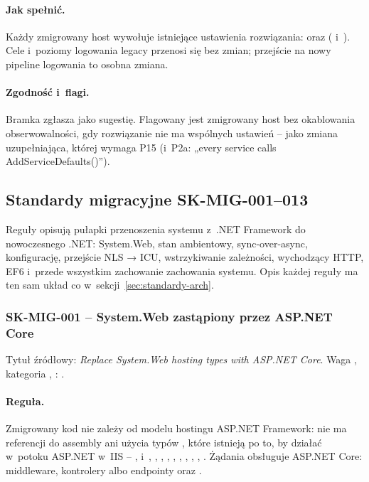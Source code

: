\paragraph{Jak spełnić.} Każdy zmigrowany host wywołuje istniejące ustawienia rozwiązania:
 oraz 
( i~). Cele i~poziomy logowania legacy przenosi się bez
zmian; przejście na nowy pipeline logowania to osobna zmiana.

\paragraph{Zgodność i~flagi.} Bramka zgłasza 
jako sugestię. Flagowany jest zmigrowany host bez okablowania obserwowalności, gdy
rozwiązanie nie ma wspólnych ustawień -- jako zmiana uzupełniająca, której wymaga P15
(i~P2a: „every service calls AddServiceDefaults()”).


\subsection{Standardy migracyjne SK-MIG-001--013}\label{sec:standardy-mig}

Reguły  opisują pułapki przenoszenia systemu z~.NET Framework do
nowoczesnego .NET: System.Web, stan ambientowy, sync-over-async, konfigurację, przejście
NLS → ICU, wstrzykiwanie zależności, wychodzący HTTP, EF6 i~przede wszystkim zachowanie
zachowania systemu. Opis każdej reguły ma ten sam układ co w~sekcji~\ref{sec:standardy-arch}.

\subsubsection{SK-MIG-001 -- System.Web zastąpiony przez ASP.NET Core}\label{sec:standardy-sk-mig-001}

Tytuł źródłowy: \emph{Replace System.Web hosting types with ASP.NET Core}. Waga
, kategoria , : .

{\raggedright
\paragraph{Reguła.} Zmigrowany kod nie zależy od modelu hostingu ASP.NET Framework: nie ma
referencji do assembly  ani użycia typów , które
istnieją po to, by działać w~potoku ASP.NET w~IIS -- ,
 i~, ,
, , ,
, , ,
, . Żądania obsługuje
ASP.NET Core: middleware, kontrolery albo endpointy oraz
.\par}

